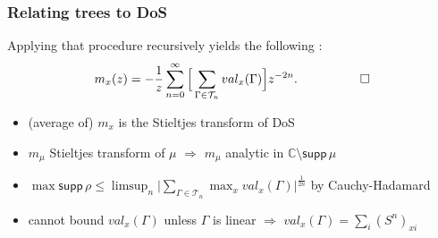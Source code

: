 \documentclass{beamer}
\numberwithin{equation}{section}
\newcommand{\ofN}{}
\newcommand{\supp}{\mathsf{supp}\,}
\newcommand{\C}{{\mathbb C}}
\newcommand{\Cr}{\color{red}}
\newcommand{\bemph}[1]{\textbf{\Cr{#1}}}
\begin{document}
\begin{frame}
\frametitle{Relating trees to DoS}
Applying that procedure recursively yields the following \bemph{Proposition}:
	$$m_x\ofN(z)=-\frac{1}{z}\sum_{n=0}^\infty \Big[\sum_{\Gamma\in\mathcal T_n}val\ofN_x(\Gamma)\Big]z^{-2n}.{\quad\quad\quad\qed}$$
	
\hrulefill
\begin{itemize}
	\item[recall:] (average of) $m_x$ is the Stieltjes transform of DoS
	\item[note:] $m_\mu$ Stieltjes transform of $\mu$ $\Rightarrow$ $m_\mu$ analytic in $\C\setminus\supp\mu$
	\item [$\Rightarrow$] $\displaystyle{\max\supp\rho\ofN\leq \limsup_n\Bigg|\sum_{\Gamma\in\mathcal T_n}\max_xval_x\ofN(\Gamma)\Bigg|^\frac{1}{2n}}$ {\small by Cauchy-Hadamard}
	\item [note:] cannot bound $val_x(\Gamma)$ unless $\Gamma$ is linear $\Rightarrow$ $val_x(\Gamma) = \sum_i(S^n)_{xi}$
\end{itemize}
\end{frame}
\end{document}
